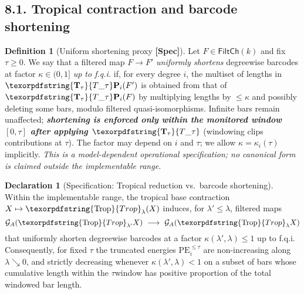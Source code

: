 \documentclass[11pt]{article}
\DeclareRobustCommand{\hyp}{\nobreakdash-}
\numberwithin{equation}{section}
\theoremstyle{definition}
\newtheorem{definition}[theorem]{Definition}
\newtheorem{declaration}[theorem]{Declaration}
\DeclareRobustCommand{\FiltCh}[1]{\mathsf{FiltCh}(#1)}
\DeclareRobustCommand{\Ttau}{\texorpdfstring{\ensuremath{\mathbf{T}_{\tau}}}{T\_\tau}}
\DeclareRobustCommand{\Trop}{\texorpdfstring{\ensuremath{\operatorname{Trop}}}{Trop}}
\begin{document}
\subsection*{8.1. Tropical contraction and barcode shortening}
\begin{definition}[Uniform shortening proxy \textbf{[Spec]}]\label{def:shorten}
Let \(F\in\FiltCh{k}\) and fix \(\tau\ge 0\).
We say that a filtered map \(F\to F'\) \emph{uniformly shortens} degreewise barcodes at factor \(\kappa\in(0,1]\) \emph{up to f.q.i.} if, for every degree \(i\), the multiset of lengths in \(\Ttau\mathbf{P}_i(F')\) is obtained from that of \(\Ttau\mathbf{P}_i(F)\) by multiplying lengths by \(\le \kappa\) and possibly deleting some bars, modulo filtered quasi\hyp isomorphisms.
Infinite bars remain unaffected; \emph{\textbf{shortening is enforced only within the monitored window \([0,\tau]\) after applying \(\Ttau\)}} (windowing clips contributions at \(\tau\)).
The factor may depend on \(i\) and \(\tau\); we allow \(\kappa=\kappa_i(\tau)\) implicitly.
\emph{This is a model\hyp dependent operational specification; no canonical form is claimed outside the implementable range.}
\end{definition}

\begin{declaration}[Specification: Tropical reduction vs.\ barcode shortening]\label{spec:trop-short}
Within the implementable range, the tropical base contraction \(X\mapsto \Trop_\lambda(X)\) induces, for \(\lambda'\le \lambda\), filtered maps
\[
  \mathcal{G}_A(\Trop_{\lambda'}X)\ \longrightarrow\ \mathcal{G}_A(\Trop_{\lambda}X)
\]
that uniformly shorten degreewise barcodes at a factor \(\kappa(\lambda',\lambda)\le 1\) up to f.q.i.
Consequently, for fixed \(\tau\) the truncated energies \(\mathrm{PE}_i^{\le\tau}\) are non\hyp increasing along \(\lambda\searrow 0\), and strictly decreasing whenever \(\kappa(\lambda',\lambda)<1\) on a subset of bars whose cumulative length within the \(\tau\)\nobreakdash window has positive proportion of the total windowed bar length.
\end{declaration}
\end{document}
